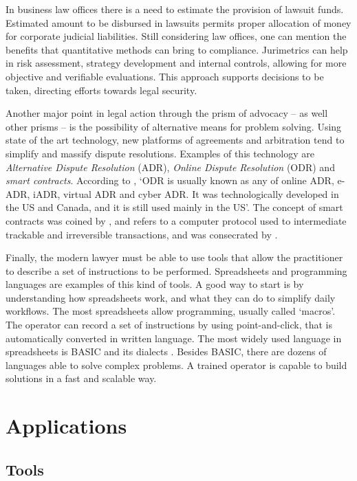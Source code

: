 \documentclass[a4paper]{exam}
\theoremstyle{plain}
\begin{document}
In business law offices there is a need to estimate the provision of lawsuit funds. Estimated amount to be disbursed in lawsuits permits proper allocation of money for corporate judicial liabilities. Still considering law offices, one can mention the benefits that quantitative methods can bring to compliance. Jurimetrics can help in risk assessment, strategy development and internal controls, allowing for more objective and verifiable evaluations. This approach supports decisions to be taken, directing efforts towards legal security.

Another major point in legal action through the prism of advocacy -- as well other prisms -- is the possibility of alternative means for problem solving. Using state of the art technology, new platforms of agreements and arbitration tend to simplify and massify dispute resolutions. Examples of this technology are \textit{Alternative Dispute Resolution} (ADR), \textit{Online Dispute Resolution} (ODR) and \textit{smart contracts}. According to \cite[p. 23]{wang2009online}, `ODR is usually known as any of online ADR, e-ADR, iADR, virtual ADR and cyber ADR. It was technologically developed in the US and Canada, and it is still used mainly in the US'. The concept of smart contracts was coined by \cite{szabo1996smart}, and refers to a computer protocol used to intermediate trackable and irreversible transactions, and was consecrated by \cite{nakamoto2008bitcoin}.

Finally, the modern lawyer must be able to use tools that allow the practitioner to describe a set of instructions to be performed. Spreadsheets and programming languages are examples of this kind of tools. A good way to start is by understanding how spreadsheets work, and what they can do to simplify daily workflows. The most spreadsheets allow programming, usually called `macros'. The operator can record a set of instructions by using point-and-click, that is automatically converted in written language. The most widely used language in spreadsheets is BASIC and its dialects \cite{kemeny1964basic}. Besides BASIC, there are dozens of languages able to solve complex problems. A trained operator is capable to build solutions in a fast and scalable way. 


\section{Applications}
 
\subsection{Tools}
\end{document}
